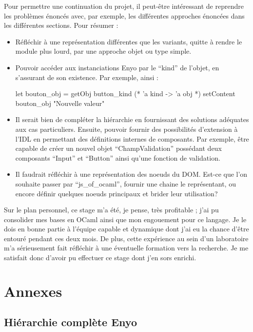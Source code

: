 \documentclass[11pt,a4paper]{report}
\begin{document}
Pour permettre une continuation du projet, il peut-être intéressant de reprendre les problèmes
énoncés avec, par exemple, les différentes approches énoncées dans les différentes sections. Pour résumer :
\begin{itemize}
\item Réfléchir à une représentation différentes que les variants, quitte à rendre le
  module plus lourd, par une approche objet ou type simple.
\item Pouvoir accéder aux instanciations Enyo par le ``kind'' de l'objet, en s'assurant
  de son existence. Par exemple, ainsi :
  \begin{OCaml}
    let bouton_obj = getObj button_kind (* 'a kind -> 'a obj *)
    setContent bouton_obj "Nouvelle valeur"
  \end{OCaml}
\item Il serait bien de compléter la hiérarchie en fournissant des solutions adéquates
  aux cas particuliers. Ensuite, pouvoir fournir des possibilités d'extension à l'IDL en permettant 
  des définitions internes de composants. Par exemple, être capable  de créer un nouvel objet ``ChampValidation'' 
  possédant deux composants ``Input'' et ``Button'' ainsi qu'une fonction de validation.
\item Il faudrait réfléchir à une représentation des noeuds du DOM. Est-ce que l'on souhaite passer 
  par ``js\_of\_ocaml'', fournir une chaine le représentant, ou encore définir quelques noeuds principaux
  et brider leur utilisation?
\end{itemize}\medskip

Sur le plan personnel, ce stage m'a été, je pense, très profitable ; j'ai pu consolider mes bases en OCaml
ainsi que mon engouement pour ce langage. Je le dois en bonne partie à l'équipe capable et dynamique
dont j'ai eu la chance d'être entouré pendant ces deux mois.
De plus, cette expérience au sein d'un laboratoire m'a sérieusement fait réfléchir à 
une éventuelle formation vers la recherche.
Je me satisfait donc d'avoir pu effectuer ce stage dont j'en sors enrichi.

\chapter{Annexes}

\section{Hiérarchie complète Enyo}\label{hier-complet}
\end{document}
